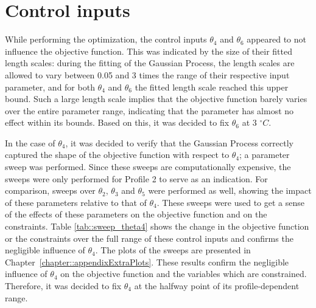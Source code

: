 \section{Control inputs}
While performing the optimization, the control inputs $\theta_4$ and $\theta_6$ 
appeared to not influence the objective function. This was indicated by 
the size of their fitted length scales: during the fitting of the Gaussian 
Process, the length scales are allowed to vary between 0.05 and 3 times the 
range of their respective input parameter, and for both $\theta_4$ and 
$\theta_6$ the fitted length scale reached this upper bound. Such a large 
length scale implies that the objective function barely varies over the entire 
parameter range, indicating that the parameter has almost no effect within 
its bounds. Based on this, it was decided to fix $\theta_6$ at 3 $^{\circ}C$.

In the case of $\theta_4$, it was decided to verify that the Gaussian Process correctly captured the shape of the objective function with respect to $\theta_4$; a parameter sweep was performed. Since these sweeps are computationally expensive, the sweeps were only performed for Profile 2 to serve as an indication. For comparison, sweeps over $\theta_2$, $\theta_3$ and $\theta_5$ were performed as well, showing the impact of these parameters relative to that of $\theta_4$. These sweeps were used to get a sense of the effects of these parameters on the objective function and on the constraints. Table \ref{tab::sweep_theta4} shows the change in the objective function or the constraints over the full range of these control inputs and confirms the negligible influence of $\theta_4$. The plots of the sweeps are presented in Chapter~\ref{chapter::appendixExtraPlots}. These results confirm the negligible influence of $\theta_4$ on the objective function and the variables which are constrained. Therefore, it was decided to fix $\theta_4$ at the halfway point of its profile-dependent range. 


